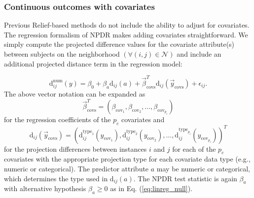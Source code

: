 \documentclass[10pt]{article}
\begin{document}

\subsubsection{Continuous outcomes with covariates}
Previous Relief-based methods do not include the ability to adjust for covariates. The regression formalism of NPDR makes adding covariates straightforward. We simply compute the projected difference values for the covariate attribute(s) between subjects on the neighborhood $(\forall(i,j) \in \mathcal{N})$ and include an additional projected distance term in the regression model:

\begin{equation}\label{eq:lin_reg_cov}
    \text{d}^{\text{num}}_{ij}(y) = \beta_{0} + \beta_{a} \text{d}_{ij}(a) + \vec{\beta}^{T}_{\text{covs}}\text{d}_{ij}(\vec{y}_{\text{covs}}) + \epsilon_{ij}.
\end{equation}
The above vector notation can be expanded as  
\begin{equation}
\vec{\beta}^{T}_{\text{covs}} = \left( \beta_{\text{cov}_1}, \beta_{\text{cov}_2}, \ldots,  \beta_{\text{cov}_{p_c}} \right)
\end{equation}
for the regression coefficients of the $p_c$ covariates and 
\begin{equation}
\text{d}_{ij}(\vec{y}_\text{covs})= \left( \text{d}^{\text{type}_1}_{ij}({y}_{\text{cov}_1}), \text{d}^{\text{type}_2}_{ij}({y}_{\text{cov}_2}), \ldots, \text{d}^{\text{type}_{p_c}}_{ij}({y}_{\text{cov}_{p_c}}) \right)^{T}
\end{equation}
for the projection differences between instances $i$ and $j$ for each of the $p_c$ covariates with the appropriate projection type for each covariate data type (e.g., numeric or categorical). The predictor attribute $a$ may be numeric or categorical, which determines the type used in $\text{d}_{ij}(a)$. The NPDR test statistic is again $\beta_a$ with alternative hypothesis $\beta_a \ge 0$ as in Eq. (\ref{eq:linreg_null}). 
\end{document}
